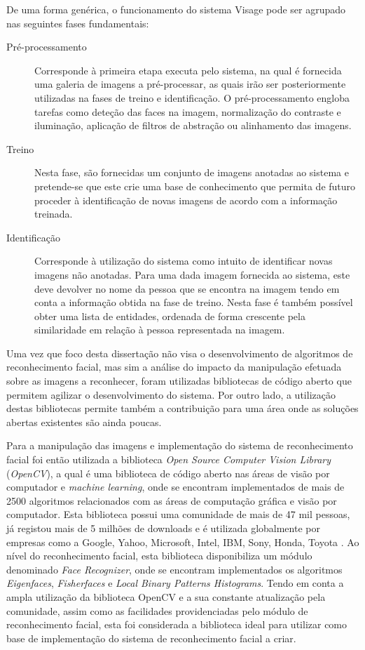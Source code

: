 De uma forma genérica, o funcionamento do sistema Visage pode ser agrupado nas seguintes fases fundamentais:
\begin{description}
\item[Pré-processamento] Corresponde à primeira etapa executa pelo sistema, na qual é fornecida uma galeria de imagens a pré-processar, as quais irão ser posteriormente utilizadas na fases de treino e identificação. O pré-processamento engloba tarefas como deteção das faces na imagem, normalização do contraste e iluminação, aplicação de filtros de abstração ou alinhamento das imagens.
\item[Treino] Nesta fase, são fornecidas um conjunto de imagens anotadas ao sistema e pretende-se que este crie uma base de conhecimento que permita de futuro proceder à identificação de novas imagens de acordo com a informação treinada.
\item[Identificação] Corresponde à utilização do sistema como intuito de identificar novas imagens não anotadas. Para uma dada imagem fornecida ao sistema, este deve devolver no nome da pessoa que se encontra na imagem tendo em conta a informação obtida na fase de treino. Nesta fase é também possível obter uma lista de entidades, ordenada de forma crescente pela similaridade em relação à pessoa representada na imagem.
\end{description}

Uma vez que foco desta dissertação não visa o desenvolvimento de algoritmos de reconhecimento facial, mas sim a análise do impacto da manipulação efetuada sobre as imagens a reconhecer, foram utilizadas bibliotecas de código aberto que permitem agilizar o desenvolvimento do sistema. Por outro lado, a utilização destas bibliotecas permite também a contribuição para uma área onde as soluções abertas existentes são ainda poucas.

Para a manipulação das imagens e implementação do sistema de reconhecimento facial foi então utilizada a biblioteca \textit{Open Source Computer Vision Library} (\textit{OpenCV}), a qual é uma biblioteca de código aberto nas áreas de visão por computador e \textit{machine learning}, onde se encontram implementados de mais de 2500 algoritmos relacionados com as áreas de computação gráfica e visão por computador. Esta biblioteca possui uma comunidade de mais de 47 mil pessoas, já registou mais de 5 milhões de downloads e é utilizada globalmente por empresas como a Google, Yahoo, Microsoft, Intel, IBM, Sony, Honda, Toyota \cite{Team}. Ao nível do reconhecimento facial, esta biblioteca disponibiliza um módulo denominado \textit{Face Recognizer}, onde se encontram implementados os algoritmos \textit{Eigenfaces}, \textit{Fisherfaces} e \textit{Local Binary Patterns Histograms}. Tendo em conta a ampla utilização da biblioteca OpenCV e a sua constante atualização pela comunidade, assim como as facilidades providenciadas pelo módulo de reconhecimento facial, esta foi considerada a biblioteca ideal para utilizar como base de implementação do sistema de reconhecimento facial a criar.

